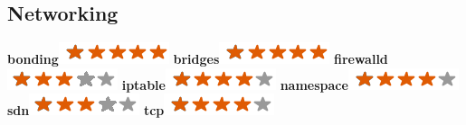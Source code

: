 \documentclass[]{friggeri-cv}
\begin{document}
\begin{aside}
    \section{Networking}
        \textbf{bonding}\includegraphics[scale=0.40]{img/5stars.png}
        \textbf{bridges}\includegraphics[scale=0.40]{img/5stars.png}
        \textbf{firewalld}\includegraphics[scale=0.40]{img/3stars.png}
        \textbf{iptable}\includegraphics[scale=0.40]{img/4stars.png}
        \textbf{namespace}\includegraphics[scale=0.40]{img/4stars.png}
        \textbf{sdn}\includegraphics[scale=0.40]{img/3stars.png}
        \textbf{tcp}\includegraphics[scale=0.40]{img/4stars.png}
        ~

\end{aside}
\end{document}
